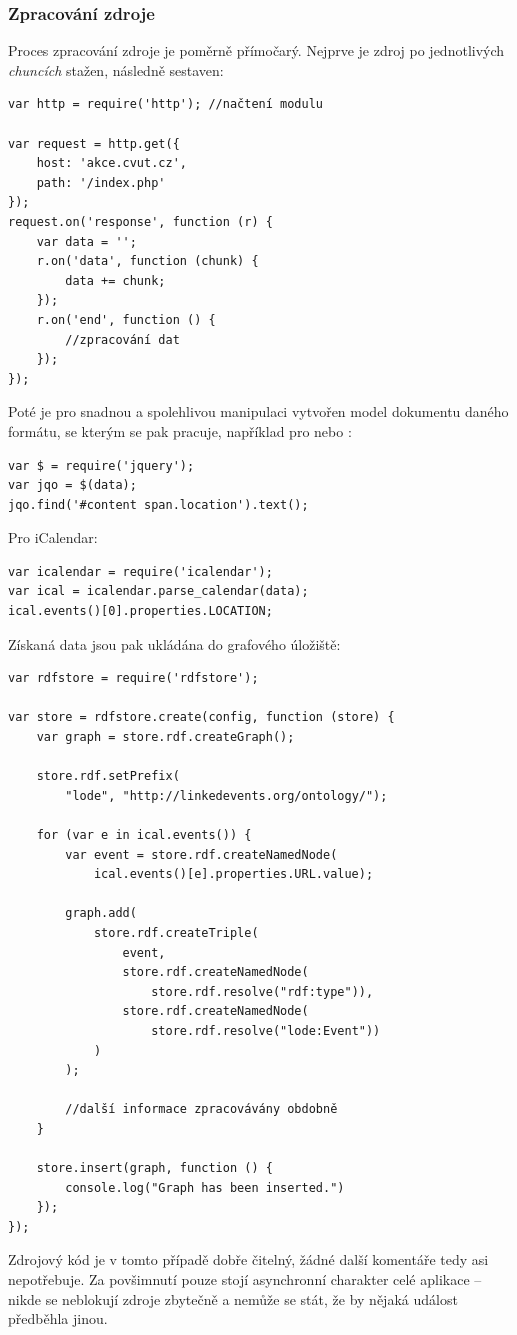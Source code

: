\subsubsection{Zpracování zdroje}
Proces zpracování zdroje je poměrně přímočarý. Nejprve je zdroj po jednotlivých \textit{chuncích} stažen, následně sestaven:
\pagebreak
\begin{verbatim}
var http = require('http'); //načtení modulu

var request = http.get({
    host: 'akce.cvut.cz',
    path: '/index.php'
});
request.on('response', function (r) {
    var data = '';
    r.on('data', function (chunk) {
        data += chunk;
    });
    r.on('end', function () {
        //zpracování dat
    });
});
\end{verbatim}
Poté je pro snadnou a spolehlivou manipulaci vytvořen model dokumentu daného formátu, se kterým se pak pracuje, například pro  nebo :
\begin{verbatim}
var $ = require('jquery');
var jqo = $(data);
jqo.find('#content span.location').text();
\end{verbatim}
Pro iCalendar:
\begin{verbatim}
var icalendar = require('icalendar');
var ical = icalendar.parse_calendar(data);
ical.events()[0].properties.LOCATION;
\end{verbatim}
Získaná data jsou pak ukládána do grafového úložiště:
\begin{verbatim}
var rdfstore = require('rdfstore');

var store = rdfstore.create(config, function (store) {
    var graph = store.rdf.createGraph();

    store.rdf.setPrefix(
        "lode", "http://linkedevents.org/ontology/");

    for (var e in ical.events()) {
        var event = store.rdf.createNamedNode(
            ical.events()[e].properties.URL.value);

        graph.add(
            store.rdf.createTriple(
                event,
                store.rdf.createNamedNode(
                    store.rdf.resolve("rdf:type")),
                store.rdf.createNamedNode(
                    store.rdf.resolve("lode:Event"))
            )
        );

        //další informace zpracovávány obdobně
    }

    store.insert(graph, function () {
        console.log("Graph has been inserted.")
    });
});
\end{verbatim}
Zdrojový kód je v tomto případě dobře čitelný, žádné další komentáře tedy asi nepotřebuje. Za povšimnutí pouze stojí asynchronní charakter celé aplikace -- nikde se neblokují zdroje zbytečně a nemůže se stát, že by nějaká událost předběhla jinou.

